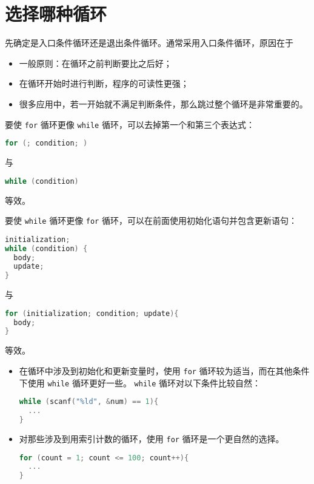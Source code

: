 \section{选择哪种循环}
\begin{frame}[fragile]\ft{\secname}
先确定是入口条件循环还是退出条件循环。通常采用入口条件循环，原因在于

\begin{itemize}
\item
一般原则：在循环之前判断要比之后好；\\[0.1in]
\item 
在循环开始时进行判断，程序的可读性更强；\\[0.1in]
\item
很多应用中，若一开始就不满足判断条件，那么跳过整个循环是非常重要的。
\end{itemize}
\end{frame}

\begin{frame}[fragile]\ft{\secname}
要使 \lstinline|for| 循环更像 \lstinline|while| 循环，可以去掉第一个和第三个表达式：
\begin{lstlisting}[language=c,frame=single]
for (; condition; )
\end{lstlisting}
与
\begin{lstlisting}[language=c,frame=single]
while (condition)
\end{lstlisting}
等效。
\end{frame}

\begin{frame}[fragile]\ft{\secname}
要使 \lstinline|while| 循环更像 \lstinline|for| 循环，可以在前面使用初始化语句并包含更新语句：
\begin{lstlisting}[language=c,frame=single]
initialization;
while (condition) {
  body;
  update;
}
\end{lstlisting}
与
\begin{lstlisting}[language=c,frame=single]
for (initialization; condition; update){
  body;
}
\end{lstlisting}
等效。
\end{frame}

\begin{frame}[fragile]\ft{\secname}
\begin{itemize}
\item 在循环中涉及到初始化和更新变量时，使用 \lstinline|for| 循环较为适当，而在其他条件下使用 \lstinline|while| 循环更好一些。 \lstinline|while| 循环对以下条件比较自然：
\begin{lstlisting}[language=c,frame=single]
while (scanf("%ld", &num) == 1){
  ...
}
\end{lstlisting}

\item 对那些涉及到用索引计数的循环，使用 \lstinline|for| 循环是一个更自然的选择。
\begin{lstlisting}[language=c,frame=single]
for (count = 1; count <= 100; count++){
  ...
}
\end{lstlisting}
\end{itemize}

\end{frame}
